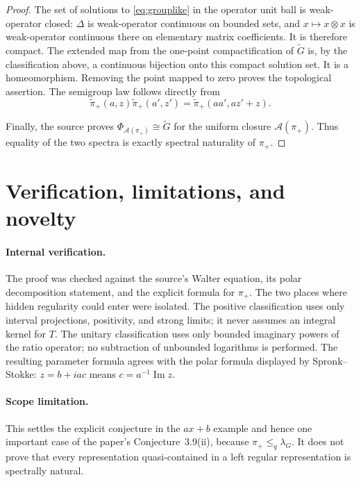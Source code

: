 \documentclass[11pt]{article}
\newcommand{\wt}{\widetilde}
\begin{document}
\begin{proof}
The set of solutions to \eqref{eq:grouplike} in the operator unit ball is
weak-operator closed: $\Delta$ is weak-operator continuous on bounded sets,
and $x\mapsto x\otimes x$ is weak-operator continuous there on elementary
matrix coefficients.  It is therefore compact.  The extended map from the
one-point compactification of $\wt G$ is, by the classification above, a
continuous bijection onto this compact solution set.  It is a homeomorphism.
Removing the point mapped to zero proves the topological assertion.  The
semigroup law follows directly from
\[
 \wt\pi_+(a,z)\wt\pi_+(a',z')
 =\wt\pi_+(aa',az'+z).
\]

Finally, the source proves
$\Phi_{\mathcal A(\pi_+)}\cong\wt G$ for the uniform closure
$\mathcal A(\pi_+)$.  Thus equality of the two spectra is exactly spectral
naturality of $\pi_+$.
\end{proof}

\section{Verification, limitations, and novelty}

\paragraph{Internal verification.}
The proof was checked against the source's Walter equation, its polar
decomposition statement, and the explicit formula for $\pi_+$.  The two
places where hidden regularity could enter were isolated.  The positive
classification uses only interval projections, positivity, and strong limits;
it never assumes an integral kernel for $T$.  The unitary classification uses
only bounded imaginary powers of the ratio operator; no subtraction of
unbounded logarithms is performed.  The resulting parameter formula agrees
with the polar formula displayed by Spronk--Stokke:
$z=b+iac$ means $c=a^{-1}\operatorname{Im}z$.

\paragraph{Scope limitation.}
This settles the explicit conjecture in the $ax+b$ example and hence one
important case of the paper's Conjecture~3.9(ii), because
$\pi_+\leq_q\lambda_G$.  It does not prove that every representation
quasi-contained in a left regular representation is spectrally natural.
\end{document}
